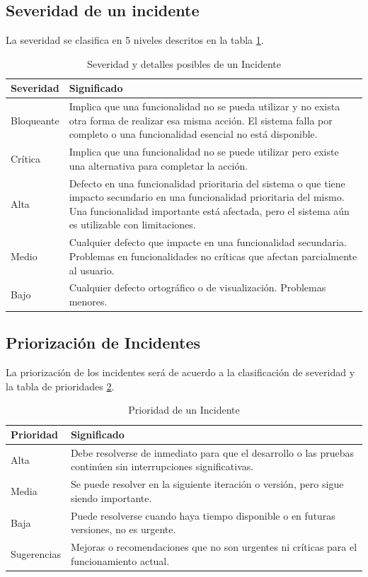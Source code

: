 \subsection{Severidad de un incidente}
La severidad se clasifica en 5 niveles descritos en la tabla \ref{tab:severidadIncidentes}.

\begin{table}[H]
    \centering
    \begin{tabular}{p{3cm}p{10cm}}
    \hline
    \textbf{Severidad} & \textbf{Significado} \\ \hline
    Bloqueante & Implica que una funcionalidad no se pueda utilizar y no exista otra forma de realizar esa misma acción. El sistema falla por completo o una funcionalidad esencial no está disponible. \\ \hline
    Crítica & Implica que una funcionalidad no se puede utilizar pero existe una alternativa para completar la acción. \\ \hline
    Alta & Defecto en una funcionalidad prioritaria del sistema o que tiene impacto secundario en una funcionalidad prioritaria del mismo. Una funcionalidad importante está afectada, pero el sistema aún es utilizable con limitaciones. \\ \hline
    Medio & Cualquier defecto que impacte en una funcionalidad secundaria. Problemas en funcionalidades no críticas que afectan parcialmente al usuario. \\ \hline
    Bajo & Cualquier defecto ortográfico o de visualización. Problemas menores. \\ \hline
    \end{tabular}
    \caption{Severidad y detalles posibles de un Incidente}
    \label{tab:severidadIncidentes}
\end{table}

\subsection{Priorización de Incidentes}

La priorización de los incidentes será de acuerdo a la clasificación de severidad y la tabla de prioridades \ref{tab:prioridadIncidentes}.


\begin{table}[H]
    \centering
    \begin{tabular}{p{3cm}p{10cm}}
    \hline
    \textbf{Prioridad} & \textbf{Significado} \\ \hline
    Alta & Debe resolverse de inmediato para que el desarrollo o las pruebas continúen sin interrupciones significativas. \\ \hline
    Media & Se puede resolver en la siguiente iteración o versión, pero sigue siendo importante. \\ \hline
    Baja & Puede resolverse cuando haya tiempo disponible o en futuras versiones, no es urgente. \\ \hline
    Sugerencias & Mejoras o recomendaciones que no son urgentes ni críticas para el funcionamiento actual. \\ \hline
    \end{tabular}
    \caption{Prioridad de un Incidente}
    \label{tab:prioridadIncidentes}
\end{table}


